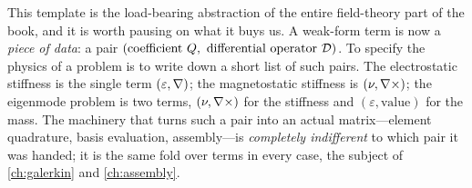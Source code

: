This template is the load-bearing abstraction of the entire field-theory part of
the book, and it is worth pausing on what it buys us. A weak-form term is now a
\emph{piece of data}: a pair $(\text{coefficient } Q,\ \text{differential
operator } \mathcal{D})$. To specify the physics of a problem is to write down a
short list of such pairs. The electrostatic stiffness is the single term
$(\varepsilon,\nabla)$; the magnetostatic stiffness is $(\nu,\nabla\times)$; the
eigenmode problem is two terms, $(\nu,\nabla\times)$ for the stiffness and
$(\varepsilon,\text{value})$ for the mass. The machinery that turns such a pair
into an actual matrix---element quadrature, basis evaluation, assembly---is
\emph{completely indifferent} to which pair it was handed; it is the same fold
over terms in every case, the subject of \cref{ch:galerkin} and
\cref{ch:assembly}.

